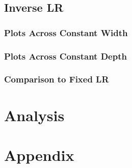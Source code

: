 \documentclass[a4paper, 12pt]{report}
\begin{document}
\begin{center}
\subsection{Inverse LR}
\begin{comment}
\end{comment}
\subsubsection{Plots Across Constant Width}
\begin{comment}
\end{comment}
\subsubsection{Plots Across Constant Depth}
\begin{comment}
\end{comment}
\subsubsection{Comparison to Fixed LR}
\begin{comment}
\end{comment}
\section{Analysis}
\begin{comment}
\end{comment}
\section{Appendix}
\begin{comment}
\end{comment}

\end{center}
\end{document}
